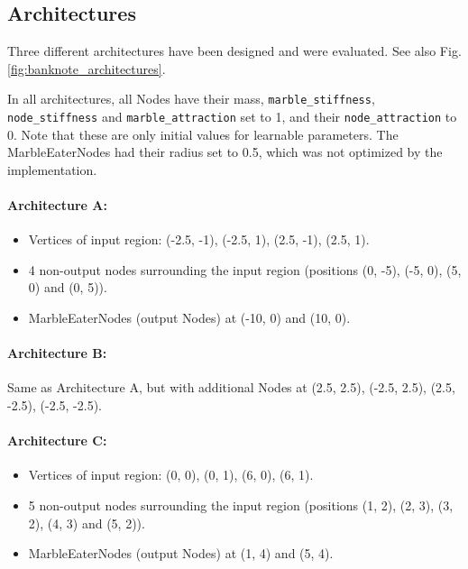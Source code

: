 \subsection{Architectures}
Three different architectures have been designed and were evaluated. See also Fig. \ref{fig:banknote_architectures}.

In all architectures, all Nodes have their mass, \texttt{marble\_stiffness},
\texttt{node\_stiffness} and \texttt{marble\_attraction} set to 1, 
and their \texttt{node\_attraction} to 0. 
Note that these are only initial values for learnable parameters. 
The MarbleEaterNodes had their radius set to 0.5, which was not optimized by the implementation.

\paragraph{Architecture A:}
\begin{itemize}
	\item Vertices of input region: (-2.5, -1), (-2.5, 1), (2.5, -1), (2.5, 1).
	\item 4 non-output nodes surrounding the input region (positions (0, -5), (-5, 0), (5, 0) and (0, 5)).
	\item MarbleEaterNodes (output Nodes) at (-10, 0) and (10, 0).
\end{itemize}

\paragraph{Architecture B:}
Same as Architecture A, but with additional Nodes at (2.5, 2.5), (-2.5, 2.5), (2.5, -2.5), (-2.5, -2.5).

\paragraph{Architecture C:}
\begin{itemize}
	\item Vertices of input region: (0, 0), (0, 1), (6, 0), (6, 1).
	\item 5 non-output nodes surrounding the input region (positions (1, 2), (2, 3), (3, 2), (4, 3) and (5, 2)).
	\item MarbleEaterNodes (output Nodes) at (1, 4) and (5, 4).
\end{itemize}

